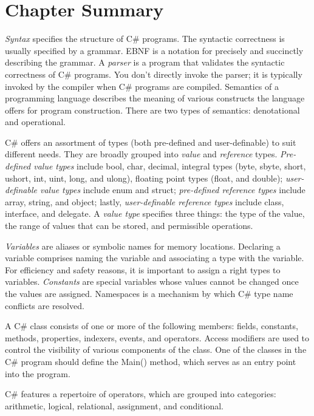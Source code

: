 \section{Chapter Summary}

\emph{Syntax} specifies the structure of C\# programs. The
syntactic correctness is usually specified by a grammar. EBNF is a
notation for precisely and succinctly describing the grammar. A
\emph{parser} is a program that validates the syntactic
correctness of C\# programs. You don't directly invoke the parser;
it is typically invoked by the compiler when C\# programs are
compiled. Semantics of a programming language describes the
meaning of various constructs the language offers for program
construction. There are two types of semantics: denotational and
operational.

C\# offers an assortment of types (both pre-defined and
user-definable) to suit different needs. They are broadly grouped
into \emph{value} and \emph{reference} types. \emph{Pre-defined
value types} include bool, char, decimal, integral types (byte,
sbyte, short, ushort, int, uint, long, and ulong), floating point
types (float, and double); \emph{user-definable value types}
include enum and struct; \emph{pre-defined reference types}
include array, string, and object; lastly, \emph{user-definable
reference types} include class, interface, and delegate. A \emph{
value type} specifies three things: the type of the value, the
range of values that can be stored, and permissible operations.

\emph{Variables} are aliases or symbolic names for memory
locations. Declaring a variable comprises naming the variable and
associating a type with the variable. For efficiency and safety
reasons, it is important to assign a right types to variables.
\emph{Constants} are special variables whose values cannot be
changed once the values are assigned. Namespaces is a mechanism by
which C\# type name conflicts are resolved.

A C\# class consists of one or more of the  following members:
fields, constants, methods, properties, indexers, events, and
operators. Access modifiers are used to control the visibility of
various components of the class. One of the classes in the C\#
program should define the Main() method, which serves as an entry
point into the program.

C\# features a repertoire of operators, which are grouped into
categories: arithmetic, logical, relational, assignment, and
conditional.

